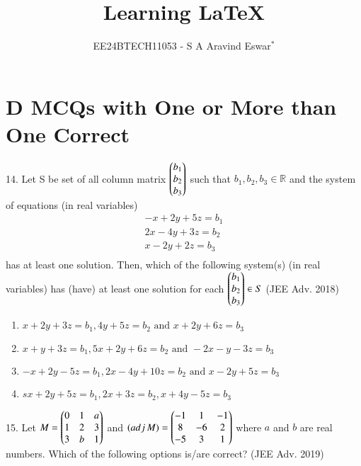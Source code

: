 \documentclass[journal,12pt,twocolumn]{IEEEtran}
\theoremstyle{remark}
\begin{document}

\vspace{3cm}

\title{Learning {\LaTeX}}
\author{EE24BTECH11053 - S A Aravind Eswar$^{*}$}
\maketitle
\newpage
\bigskip

\renewcommand{\thefigure}{\theenumi}
\renewcommand{\thetable}{\theenumi}
\section{D MCQs with One or More than One Correct}
14. Let S be set of all column matrix $\begin{pmatrix}
    b_1\\
    b_2\\
    b_3
\end{pmatrix}$ such that $b_1, b_2, b_3 \in \mathbb{R}$ and the system of equations (in real variables)\\ \begin{align*}
    -x+2y+5z=b_1\\
    2x-4y+3z=b_2\\
    x-2y+2z=b_3
\\ \end{align*} has at least one solution. Then, which of the following system(s) (in real variables) has (have) at least one solution for each $\begin{pmatrix}
    b_1\\
    b_2\\
    b_3
\end{pmatrix}\in S$ \hfill(JEE Adv. 2018)

\begin{enumerate}
    \item $x+2y+3z=b_1, 4y+5z=b_2 \text{ and }x+2y+6z=b_3$
    \item $x+y+3z=b_1, 5x+2y+6z=b_2\text{ and }-2x-y-3z=b_3$
    \item $-x+2y-5z=b_1,2x-4y+10z=b_2\text{ and }x-2y+5z=b_3$
    \item $sx+2y+5z=b_1,2x+3z=b_2,x+4y-5z=b_3$\\[2pt]
\end{enumerate}

15. Let $M=\begin{pmatrix}
    0 & 1 & a\\
    1 & 2 & 3\\
    3 & b & 1
\end{pmatrix}$ and $(\mathop{adj}M)=\begin{pmatrix}
    -1 & 1 & -1\\
    8 & -6 & 2\\
    -5 & 3 & 1
\end{pmatrix}$ where $a$ and $b$ are real numbers. Which of the following options is/are correct? \hfill (JEE Adv. 2019)
\end{document}
